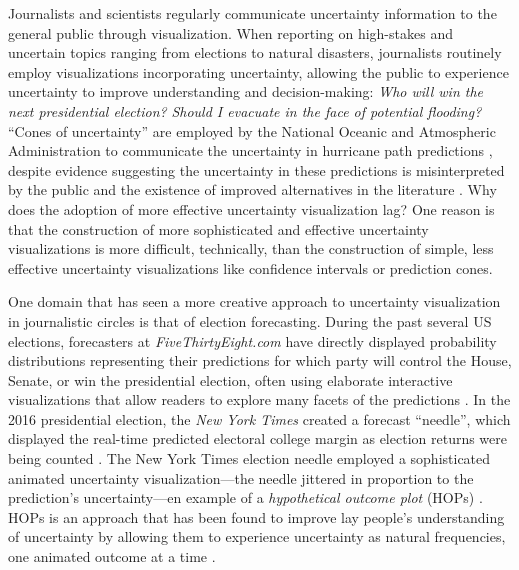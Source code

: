 \documentclass[11pt]{article}
\begin{document}

\figexamples

\noindent Journalists and scientists regularly communicate uncertainty information to the general public through visualization. When reporting on high-stakes and uncertain topics ranging from elections to natural disasters, journalists routinely employ visualizations incorporating uncertainty, allowing the public to experience uncertainty to improve understanding and decision-making: \emph{Who will win the next presidential election?} \emph{Should I evacuate in the face of potential flooding?} ``Cones of uncertainty'' are employed by the National Oceanic and Atmospheric Administration to communicate the uncertainty in hurricane path predictions \cite{noaa2014cone}, despite evidence suggesting the uncertainty in these predictions is misinterpreted by the public \cite{ruginski2016nonexpert_hurricane_cones} and the existence of improved alternatives in the literature \cite{padilla2017effects, Mirzargar2014curve_boxplot}. Why does the adoption of more effective uncertainty visualization lag? One reason is that the construction of more sophisticated and effective uncertainty visualizations is more difficult, technically, than the construction of simple, less effective uncertainty visualizations like confidence intervals or prediction cones.

One domain that has seen a more creative approach to uncertainty visualization in journalistic circles is that of election forecasting. During the past several US elections, forecasters at \textit{FiveThirtyEight.com} have directly displayed probability distributions representing their predictions for which party will control the House, Senate, or win the presidential election, often using elaborate interactive visualizations that allow readers to explore many facets of the predictions \cite{noauthor_forecasting_nodate}. In the 2016 presidential election, the \textit{New York Times} created a forecast ``needle'', which displayed the real-time predicted electoral college margin as election returns were being counted \cite{gregor_aisch_live_2016}. The New York Times election needle employed a sophisticated animated uncertainty visualization---the needle jittered in proportion to the prediction's uncertainty---en example of a \emph{hypothetical outcome plot} (HOPs) \cite{hullman2015hops}. HOPs is an approach that has been found to improve lay people's understanding of uncertainty by allowing them to experience uncertainty as natural frequencies, one animated outcome at a time \cite{hullman2015hops, kale2018hypothetical}. 
\end{document}
